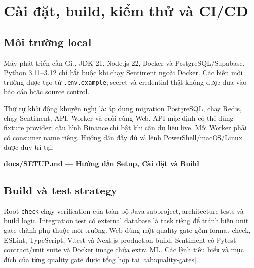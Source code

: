 \documentclass[12pt,a4paper,oneside]{report}
\begin{document}
\chapter{Cài đặt, build, kiểm thử và CI/CD}
\label{chap:operations}

\section{Môi trường local}

Máy phát triển cần Git, JDK 21, Node.js 22, Docker và PostgreSQL/Supabase. Python 3.11--3.12 chỉ bắt buộc khi chạy Sentiment ngoài Docker. Các biến môi trường được tạo từ \texttt{.env.example}; secret và credential thật không được đưa vào báo cáo hoặc source control.

Thứ tự khởi động khuyến nghị là: áp dụng migration PostgreSQL, chạy Redis, chạy Sentiment, API, Worker và cuối cùng Web. API mặc định có thể dùng fixture provider; cấu hình Binance chỉ bật khi cần dữ liệu live. Mỗi Worker phải có consumer name riêng. Hướng dẫn đầy đủ và lệnh PowerShell/macOS/Linux được duy trì tại:

\begin{center}
\href{https://github.com/PhamVanMinhBinhThuan/crypto-strategy-platform/blob/main/docs/SETUP.md}{\textbf{docs/SETUP.md — Hướng dẫn Setup, Cài đặt và Build}}
\end{center}

\section{Build và test strategy}

Root \texttt{check} chạy verification của toàn bộ Java subproject, architecture tests và build logic. Integration test có external database là task riêng để tránh biến unit gate thành phụ thuộc môi trường. Web dùng một quality gate gồm format check, ESLint, TypeScript, Vitest và Next.js production build. Sentiment có Pytest contract/unit suite và Docker image chứa extra ML.
Các lệnh tiêu biểu và mục đích của từng quality gate được tổng hợp tại \cref{tab:quality-gates}.
\end{document}

